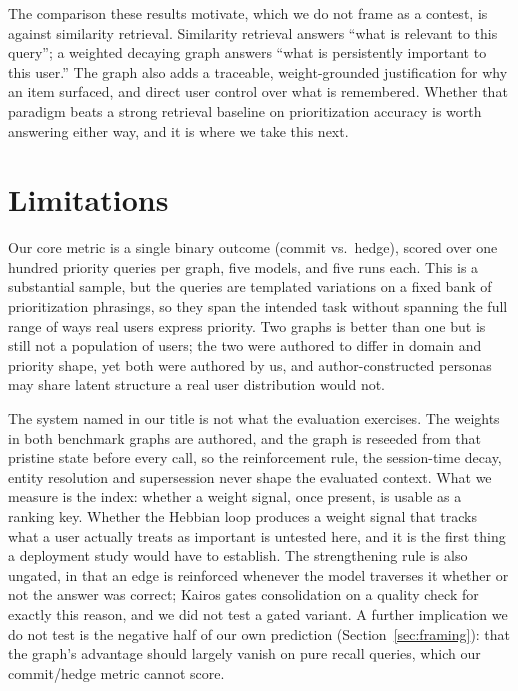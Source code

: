 \documentclass[11pt]{article}
\begin{document}
The comparison these results motivate, which we do not frame as a contest, is against similarity retrieval. Similarity retrieval answers ``what is relevant to this query''; a weighted decaying graph answers ``what is persistently important to this user.'' The graph also adds a traceable, weight-grounded justification for why an item surfaced, and direct user control over what is remembered. Whether that paradigm beats a strong retrieval baseline on prioritization accuracy is worth answering either way, and it is where we take this next.

\section*{Limitations}

Our core metric is a single binary outcome (commit vs.\ hedge), scored over one hundred priority queries per graph, five models, and five runs each. This is a substantial sample, but the queries are templated variations on a fixed bank of prioritization phrasings, so they span the intended task without spanning the full range of ways real users express priority. Two graphs is better than one but is still not a population of users; the two were authored to differ in domain and priority shape, yet both were authored by us, and author-constructed personas may share latent structure a real user distribution would not.

The system named in our title is not what the evaluation exercises. The weights in both benchmark graphs are authored, and the graph is reseeded from that pristine state before every call, so the reinforcement rule, the session-time decay, entity resolution and supersession never shape the evaluated context. What we measure is the index: whether a weight signal, once present, is usable as a ranking key. Whether the Hebbian loop produces a weight signal that tracks what a user actually treats as important is untested here, and it is the first thing a deployment study would have to establish. The strengthening rule is also ungated, in that an edge is reinforced whenever the model traverses it whether or not the answer was correct; Kairos \citep{singh2025validation} gates consolidation on a quality check for exactly this reason, and we did not test a gated variant. A further implication we do not test is the negative half of our own prediction (Section~\ref{sec:framing}): that the graph's advantage should largely vanish on pure recall queries, which our commit/hedge metric cannot score.
\end{document}
